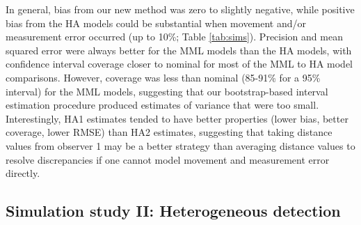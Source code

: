 \documentclass[12pt,fleqn]{article}
\begin{document}
In general, bias from our new method was zero to slightly negative, while positive bias from the HA models could be substantial when movement and/or measurement error occurred (up to 10\%; Table \ref{tab:sims}).  Precision and mean squared error were always better for the MML models than the HA models, with  confidence interval coverage closer to nominal for most of the MML to HA model comparisons.  However, coverage was less than nominal (85-91\% for a 95\% interval) for the MML models, suggesting that our bootstrap-based interval estimation procedure produced estimates of variance that were too small.  Interestingly, HA1 estimates tended to have better properties (lower bias, better coverage, lower RMSE) than HA2 estimates, suggesting that taking distance values from observer 1 may be a better strategy than averaging distance values to resolve discrepancies if one cannot model movement and measurement error directly.


\subsection{Simulation study II: Heterogeneous detection}
\end{document}

